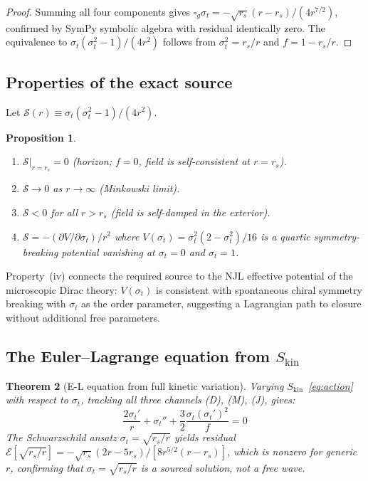 \documentclass[11pt,a4paper]{article}
\theoremstyle{plain}
\newtheorem{theorem}{Theorem}[section]
\newtheorem{proposition}[theorem]{Proposition}
\theoremstyle{definition}
\theoremstyle{remark}
\newcommand{\sigt}{\sigma_t}
\newcommand{\rs}{r_s}
\newcommand{\boxg}{\square_g}
\newcommand{\Skin}{S_{\mathrm{kin}}}
\begin{document}
\begin{proof}
Summing all four components gives
$\boxg\sigt = -\sqrt{\rs}(r-\rs)/(4r^{7/2})$,
confirmed by SymPy symbolic algebra with residual identically zero.
The equivalence to $\sigt(\sigt^2-1)/(4r^2)$ follows from $\sigt^2 = \rs/r$ and $f = 1-\rs/r$.
\end{proof}

\subsection{Properties of the exact source}

Let $\mathcal{S}(r) \equiv \sigt(\sigt^2-1)/(4r^2)$.

\begin{proposition}\label{prop:source_props}
\begin{enumerate}[label=\rm(\roman*)]
  \item $\mathcal{S}|_{r=\rs} = 0$ (horizon; $f=0$, field is self-consistent at $r=\rs$).
  \item $\mathcal{S} \to 0$ as $r\to\infty$ (Minkowski limit).
  \item $\mathcal{S} < 0$ for all $r > \rs$ (field is self-damped in the exterior).
  \item $\mathcal{S} = -(\partial V/\partial\sigt)/r^2$ where
    $V(\sigt) = \sigt^2(2-\sigt^2)/16$ is a \emph{quartic symmetry-breaking potential}
    vanishing at $\sigt = 0$ and $\sigt = 1$.
\end{enumerate}
\end{proposition}

Property~(iv) connects the required source to the NJL effective potential of the
microscopic Dirac theory: $V(\sigt)$ is consistent with spontaneous chiral symmetry breaking
with $\sigt$ as the order parameter, suggesting a Lagrangian path to closure without
additional free parameters.

\subsection{The Euler--Lagrange equation from $\Skin$}

\begin{theorem}[E-L equation from full kinetic variation]
\label{thm:EL}
Varying $\Skin$~\eqref{eq:action} with respect to $\sigt$, tracking all three
channels (D), (M), (J), gives:
\begin{equation}
  \boxed{\frac{2\sigt'}{r} + \sigt'' + \frac{3}{2}\frac{\sigt(\sigt')^2}{f} = 0}
  \label{eq:EL}
\end{equation}
The Schwarzschild ansatz $\sigt = \sqrt{\rs/r}$ yields residual
$\mathcal{E}[\sqrt{\rs/r}] = -\sqrt{\rs}(2r-5\rs)/[8r^{5/2}(r-\rs)]$, which is nonzero
for generic $r$, confirming that $\sigt = \sqrt{\rs/r}$ is a \emph{sourced}
solution, not a free wave.
\end{theorem}
\end{document}

